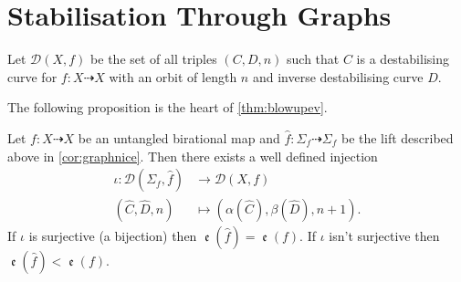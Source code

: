 \documentclass[11pt, final]{amsart}
\newcommand{\dashto}{\dashrightarrow}
\newcommand{\sgraph}{\Sigma}
\newcommand{\nice}{untangled}
\DeclareMathOperator{\comp}{\mathfrak e}
\begin{document}
\section{Stabilisation Through Graphs}\label{sec:blowupev}
 
\begin{defn}
 Let $\mathcal D(X, f)$ be the set of all triples $(C, D, n)$ such that $C$ is a destabilising curve for $f : X \dashto X$ with an orbit of length $n$ and inverse destabilising curve $D$.
 \end{defn}

The following proposition is the heart of \autoref{thm:blowupev}.
 
\begin{prop}\label{prop:blowupev}
 Let $f : X \dashto X$ be an \nice{} birational map and $\hat f : \sgraph_{\!f} \dashto \sgraph_{\!f}$ be the lift described above in \autoref{cor:graphnice}.
Then there exists a well defined injection
\begin{align*}
\iota : \mathcal D(\sgraph_{\!f}, \hat f) &\longrightarrow \mathcal D(X, f) \\
(\hat C, \hat D, n) &\longmapsto (\alpha(\hat C), \beta(\hat D), n+1).
\end{align*}
If $\iota$ is surjective (a bijection) then $\comp(\hat f) = \comp(f)$.
If $\iota$ isn't surjective then $\comp(\hat f) < \comp(f)$.
\end{prop}
\end{document}
